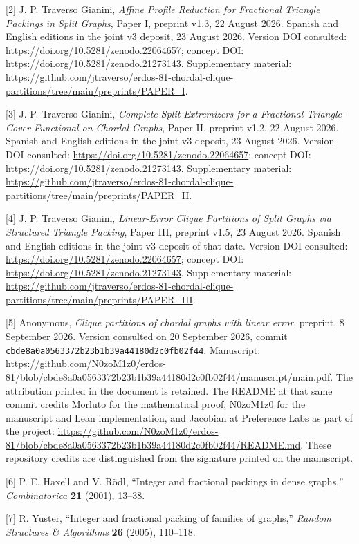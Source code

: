 \documentclass[english,11pt,a4paper]{article}
\begin{document}
{[}2{]} J. P. Traverso Gianini, \emph{Affine Profile Reduction for
Fractional Triangle Packings in Split Graphs}, Paper I, preprint v1.3,
22 August 2026. Spanish and English editions in the joint v3 deposit, 23
August 2026. Version DOI consulted:
\url{https://doi.org/10.5281/zenodo.22064657}; concept DOI:
\url{https://doi.org/10.5281/zenodo.21273143}. Supplementary material:
\url{https://github.com/jtraverso/erdos-81-chordal-clique-partitions/tree/main/preprints/PAPER_I}.

{[}3{]} J. P. Traverso Gianini, \emph{Complete-Split Extremizers for a
Fractional Triangle-Cover Functional on Chordal Graphs}, Paper II,
preprint v1.2, 22 August 2026. Spanish and English editions in the joint
v3 deposit, 23 August 2026. Version DOI consulted:
\url{https://doi.org/10.5281/zenodo.22064657}; concept DOI:
\url{https://doi.org/10.5281/zenodo.21273143}. Supplementary material:
\url{https://github.com/jtraverso/erdos-81-chordal-clique-partitions/tree/main/preprints/PAPER_II}.

{[}4{]} J. P. Traverso Gianini, \emph{Linear-Error Clique Partitions of
Split Graphs via Structured Triangle Packing}, Paper III, preprint v1.5,
23 August 2026. Spanish and English editions in the joint v3 deposit of
that date. Version DOI consulted:
\url{https://doi.org/10.5281/zenodo.22064657}; concept DOI:
\url{https://doi.org/10.5281/zenodo.21273143}. Supplementary material:
\url{https://github.com/jtraverso/erdos-81-chordal-clique-partitions/tree/main/preprints/PAPER_III}.

{[}5{]} Anonymous, \emph{Clique partitions of chordal graphs with linear
error}, preprint, 8 September 2026. Version consulted on 20 September
2026, commit \nolinkurl{cbde8a0a0563372b23b1b39a44180d2c0fb02f44}.
Manuscript:
\url{https://github.com/N0zoM1z0/erdos-81/blob/cbde8a0a0563372b23b1b39a44180d2c0fb02f44/manuscript/main.pdf}.
The attribution printed in the document is retained. The README at that
same commit credits Morluto for the mathematical proof, N0zoM1z0 for the
manuscript and Lean implementation, and Jacobian at Preference Labs as
part of the project:
\url{https://github.com/N0zoM1z0/erdos-81/blob/cbde8a0a0563372b23b1b39a44180d2c0fb02f44/README.md}.
These repository credits are distinguished from the signature printed on
the manuscript.

{[}6{]} P. E. Haxell and V. Rödl, ``Integer and fractional packings in
dense graphs,'' \emph{Combinatorica} \textbf{21} (2001), 13--38.

{[}7{]} R. Yuster, ``Integer and fractional packing of families of
graphs,'' \emph{Random Structures \& Algorithms} \textbf{26} (2005),
110--118.
\end{document}
